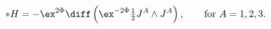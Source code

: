 \begin{equation}
\label{sp2H}
   * H = -\ex^{2\Phi}\diff \left(
         \ex^{-2\Phi}\tfrac{1}{2}J^{A}\wedge J^{A} \right) ,
      \qquad \text{for $A=1,2,3$} .
\end{equation}

